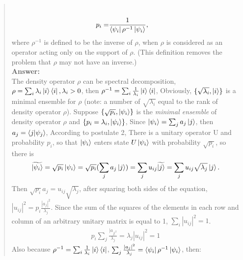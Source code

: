 \documentclass[UTF8]{ctexart}
\begin{document}
\begin{quote}
   \\
   \begin{equation}
	   \begin{aligned}
		   p_{i}=&\frac{1}{\bra{\psi_{i}}\rho^{-1}\ket{\psi_{i}}},
	   \end{aligned}
   \end{equation}
   where $\rho^{-1}$ is defined to be the inverse of $\rho$, when  $\rho$ is considered as an operator
	acting only on the support of  $\rho$. (This definition removes the problem that  $\rho$ may not have an inverse.)
	\\
\textbf{Answer:}\\
The density operator $\rho$ can be spectral decomposition, $\rho=\sum_{i}\lambda_{i}\ket{i}\bra{i}, \lambda_{i}>0 $,
 then $\rho^{-1}=\sum_{i}\frac{1}{\lambda_{i}}\ket{i}\bra{i}$, Obviously, $\{\sqrt{\lambda_{i}}, \ket{i} \}$ is a minimal 
 ensemble for $\rho$ (note: a number of $\sqrt{\lambda_{i}}$  equal to the rank of density operator $\rho$).
 Suppose $\{\sqrt{p_{i}}, \ket{\psi_{i}} \}$ is the \emph{minimal ensemble} of density operator $\rho$ and $\{p_{i}=\lambda_{i},\ket{\psi_{i}}\}$,  
Since $\ket{\psi_{i}}=\sum_{j}a_{j}\ket{j} $, then $a_{j}=\bra{j}\ket{\psi_{j}}$, 
According to  postulate 2, There is a unitary operator U and probability $p_{i}$, 
so that $\ket{\psi_{i}}$ enters state $U\ket{\psi_{i}}$ with probability $\sqrt{p_{i}}$, so there is\\
\begin{equation}
	\begin{aligned}
		\widetilde{\ket{\psi_{i}}}=\sqrt{p_{i}}\ket{\psi_{i}}=\sqrt{p_{i}}(\sum_{j}a_{j}\ket{j})
		=\sum_{j}u_{ij}\widetilde{\ket{j}}=\sum_{j}u_{ij}\sqrt{\lambda_{j}}\ket{j}.
	\end{aligned}
\end{equation}
Then $\sqrt{p_{i}}a_{j}=u_{ij}\sqrt{\lambda_{j}}$, after squaring both sides of the equation, $|u_{ij}|^{2}=p_{i}\frac{|a_{j}|^{2}}{\lambda_{j}}$.
Since the sum of the squares of the elements in each row and column of an arbitrary unitary matrix is equal to 1, $\sum_{i}|u_{ij}|^{2}=1$.
\begin{equation}
	\begin{aligned}
		p_{i}\sum_{j}\frac{|a_{j|^{2}}}{\lambda_{j}}=\lambda_{j}|u_{ij}|^{2}=1
	\end{aligned}
\end{equation}
Also because $ \rho^{-1}=\sum_{i}\frac{1}{\lambda_{i}}\ket{i}\bra{i}$, $\sum_{j}\frac{|a_{j}|^{2}}{\lambda_{j}}=\bra{\psi_{i}}\rho^{-1}\ket{\psi_{i}}$, then:\\

\end{quote}
\end{document}
